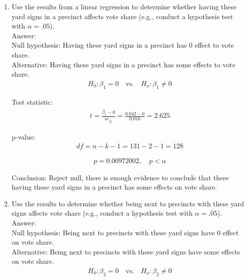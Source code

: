 \documentclass[12pt,letterpaper]{article}
\begin{document}
\vspace{.5cm}
\begin{enumerate}
	\item [(a)] Use the results from a linear regression to determine whether having these yard signs in a precinct affects vote share (e.g., conduct a hypothesis test with $\alpha = .05$).\\
	\newpage
	Answer: \\
	Null hypothesis: Having these yard signs in a precinct has 0 effect to vote share.\\
	Alternative: Having these yard signs in a precinct has some effects to vote share.\\
	\begin{align*}
		H_0: \beta_1 = 0 \quad \text{vs.} \quad H_a: \beta_1 \neq 0
	\end{align*}
	
	Test statistic:
	\begin{align*}
		t = \frac{\hat{\beta}_1 - 0}{se_{\hat{\beta}_1}} = \frac{0.042 - 0}{0.016} = 2.625
	\end{align*}
	
	p-value:
	\begin{align}
		df = n-k-1 = 131-2-1 = 128
	\end{align}
	
	\begin{align}
		p = 0.00972002, \quad p < \alpha
	\end{align}
	
	Conclusion: Reject null, there is enough evidence to conclude that there having these yard signs in a precinct has some effects on vote share.
	
	
	\newpage		
	\item [(b)]  Use the results to determine whether being
	next to precincts with these yard signs affects vote
	share (e.g., conduct a hypothesis test with $\alpha = .05$). \\
	
	Answer: \\
	Null hypothesis: Being next to precincts with these yard signs have 0 effect on vote share.\\
	Alternative: Being next to precincts with these yard signs have some effects on vote share.\\
	\begin{align*}
		H_0: \beta_2 = 0 \quad \text{vs.} \quad H_a: \beta_2 \neq 0
	\end{align*}
	

\end{enumerate}
\end{document}
